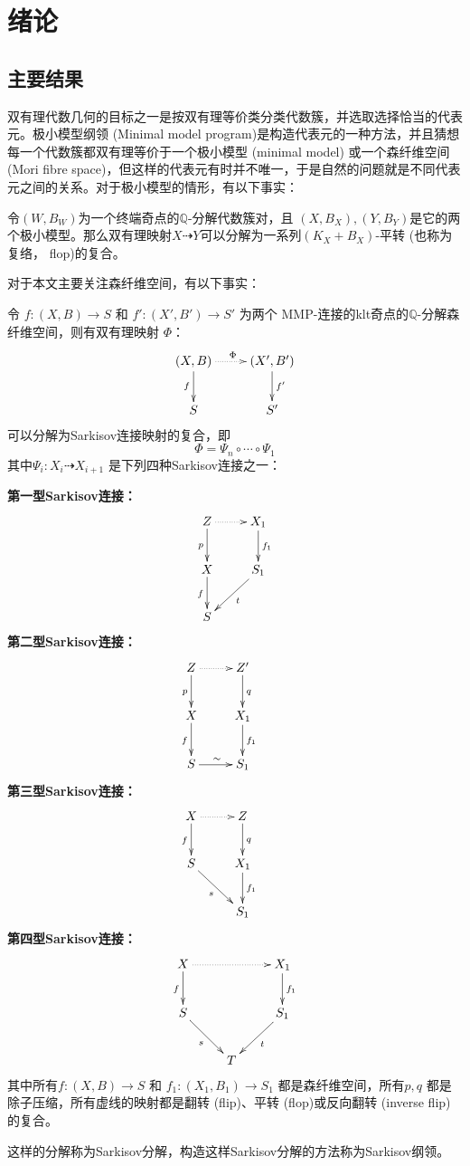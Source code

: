 \chapter{绪论}
\section{主要结果}
双有理代数几何的目标之一是按双有理等价类分类代数簇，并选取选择恰当的代表元。极小模型纲领 (Minimal model program)是构造代表元的一种方法，并且猜想每一个代数簇都双有理等价于一个极小模型 (minimal model) 或一个森纤维空间 (Mori fibre space)，但这样的代表元有时并不唯一，于是自然的问题就是不同代表元之间的关系。对于极小模型的情形，有以下事实：
\begin{theorem}[平转连接极小模型]\cite[Theorem 1]{flopmin}
  令$(W,B_{W})$为一个终端奇点的$\mathbb{Q}$-分解代数簇对，且 $(X,B_{X}), (Y,B_{Y})$是它的两个极小模型。那么双有理映射$X \dashrightarrow Y$可以分解为一系列$(K_{X}+B_{X})$-平转 (也称为复络， flop)的复合。
\end{theorem}

对于本文主要关注森纤维空间，有以下事实：
\begin{theorem}[Sarkisov分解]\cite[Theorem 1.1]{haconSarkisovProgram2012}\label{main}
  令 $ f:(X, B)\to S$ 和 $f':(X', B')\to S' $ 为两个 MMP-连接的klt奇点的$ \mathbb{Q} $-分解森纤维空间，则有双有理映射 $\Phi$：
  \[ \xymatrix{
      (X,B)\ar[d]_{f}\ar@{.>}[r]^\Phi & (X',B')\ar[d]^{f'}\\
      S & S'} \]
  可以分解为Sarkisov连接映射的复合，即
  \[ \Phi=\Psi_{n}\circ \cdots \circ \Psi_{1} \]
  其中$\Psi_{i}:X_{i}\dashrightarrow X_{i+1} $ 是下列四种Sarkisov连接之一：

  \textbf{第一型Sarkisov连接：}
  \[\xymatrix{
      Z\ar[d]_{p}\ar@{.>}[r]&X_{1}\ar[d]^{f_1}\\
      X\ar[d]_{f}&S_1\ar[dl]^{t}\\
  S &}\]
  \textbf{第二型Sarkisov连接：}
  \[\xymatrix{
      Z\ar[d]_{p}\ar@{.>}[r]&Z'\ar[d]^{q}&\\
      X\ar[d]_{f}&X_1\ar[d]^{f_1}\\
  S\ar[r]^{\sim}&S_1}\]
  \textbf{第三型Sarkisov连接：}
\[ \xymatrix{
    X\ar@{.>}[r]\ar[d]_{f}& Z\ar[d]^q& \\
    S\ar[rd]_{s}         & X_{1}\ar[d]^{f_{1}}&\\
    &S_{1}
    } \]
  \textbf{第四型Sarkisov连接：}
\[ \xymatrix{
      X \ar[d]_f\ar@{.>}[rr]&&X_{1}\ar[d]^{f_1}\\
      S \ar[dr]_{s}&&S_{1} \ar[dl]^{t}\\
      &T &} \]
  其中所有$ f:(X, B)\to S $ 和 $ f_1:(X_1, B_1)\to S_1 $ 都是森纤维空间，所有$p,q$ 都是除子压缩，所有虚线的映射都是翻转 (flip)、平转 (flop)或反向翻转 (inverse flip)的复合。
\end{theorem}
这样的分解称为Sarkisov分解，构造这样Sarkisov分解的方法称为Sarkisov纲领。

